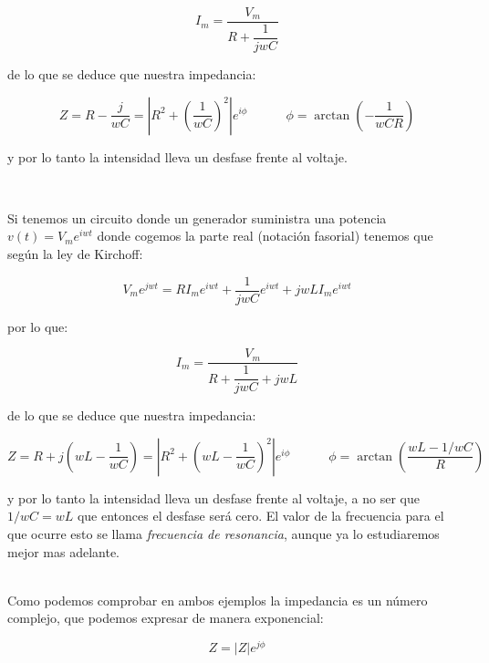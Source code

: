\documentclass[12pt,a4paper]{article}
\newcommand{\parentesis}[1]{\left( #1  \right)}
\newcommand{\tquad}{\quad \quad \quad}
\begin{document}
\begin{equation}
I_m = \dfrac{V_m}{R +  \dfrac{1}{jwC}}
\end{equation}

de lo que se deduce que nuestra impedancia:

\begin{equation}
Z = R - \dfrac{j}{wC} = \left| R^2 +  \parentesis{\dfrac{1}{wC}}^2 \right| e^{i \phi} \tquad \phi = \arctan(-\dfrac{1}{wCR})
\end{equation}

y por lo tanto la intensidad lleva un desfase frente al voltaje.

\hrulefill \\


\hrulefill 

Si tenemos un circuito donde un generador suministra una potencia $v(t) = V_m e^{iwt}$ donde cogemos la parte real (notación fasorial) tenemos que según la ley de Kirchoff:

\begin{equation}
V_m e^{jwt} = R I_m e^{iwt} + \dfrac{1}{jwC} e^{iwt}  + jwLI_m e^{iwt}  
\end{equation}

por lo que:

\begin{equation}
I_m = \dfrac{V_m}{R +  \dfrac{1}{jwC} + jwL}
\end{equation}

de lo que se deduce que nuestra impedancia:

\begin{equation}
Z = R + j\parentesis{wL - \dfrac{1}{wC}}= \left| R^2 +  \parentesis{wL -\dfrac{1}{wC}}^2 \right| e^{i \phi} \tquad \phi = \arctan(\dfrac{wL  - 1/wC}{R})
\end{equation}

y por lo tanto la intensidad lleva un desfase frente al voltaje, a no ser que $1/wC = wL$ que entonces el desfase será cero. El valor de la frecuencia para el que ocurre esto se llama \textit{frecuencia de resonancia}, aunque ya lo estudiaremos mejor mas adelante.

\hrulefill \\


Como podemos comprobar en ambos ejemplos la impedancia es un número complejo, que podemos expresar de manera exponencial:

\begin{equation}
Z = |Z| e^{j\phi}
\end{equation}
\end{document}
